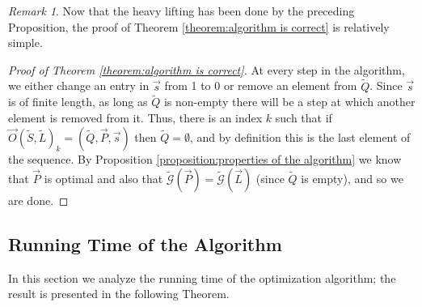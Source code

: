 \documentclass[12pt]{amsbook}
\theoremstyle{plain}
\theoremstyle{definition}
\theoremstyle{remark}
\newtheorem{remark}{Remark}
\newcommand{\lst}{\vec}
\newcommand{\set}{\tilde}
\newcommand{\genfun}{\tilde{\mathcal{G}}}
\begin{document}
\begin{remark}
Now that the heavy lifting has been done by the preceding Proposition, the proof of Theorem \ref{theorem:algorithm is correct} is relatively simple.
\end{remark}

\begin{proof}[Proof of Theorem \ref{theorem:algorithm is correct}]
At every step in the algorithm, we either change an entry in $\lst s$ from 1 to 0 or remove an element from $\set Q$.  Since $\lst s$ is of finite length, as long as $\set Q$ is non-empty there will be a step at which another element is removed from it.  Thus, there is an index $k$ such that if $\lst O(\set S,\set L)_k=(\set Q,\lst P,\lst s)$ then $\set Q=\emptyset$, and by definition this is the last element of the sequence.  By Proposition \ref{proposition:properties of the algorithm} we know that $\lst P$ is optimal and also that $\genfun(\lst P)=\genfun(\lst L)$ (since $\set Q$ is empty), and so we are done.
\end{proof}
\subsection{Running Time of the Algorithm}

\label{subsubsection:running time analysis}

In this section we analyze the running time of the optimization algorithm;  the result is presented in the following Theorem.
\end{document}
